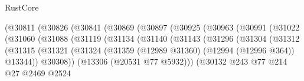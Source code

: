 \begin{lexlean}{RustCore}
\begin{coremodule}
                                      (@30811
                                        (@30826
                                          (@30841
                                            (@30869
                                              (@30897
                                                (@30925
                                                  (@30963
                                                    (@30991
                                                      (@31022
                                                        (@31060
                                                          (@31088
                                                            (@31119
                                                              (@31134
                                                                (@31140
                                                                  (@31143
                                                                    (@31296
                                                                      (@31304
                                                                        (@31312
                                                                          (@31315
                                                                            (@31321
                                                                              (@31324
                                                                                (@31359
                                                                                  (@12989 @31360)
                                                                                  (@12994
                                                                                    (@12996 @364))
                                                                                  @13344))
                                                                              @30308))
                                                                          (@13306
                                                                            (@20531 @77 @5932)))
                                                                        (@30132
                                                                          @243
                                                                          @77
                                                                          @214
                                                                          @27
                                                                          @2469
                                                                          @2524

\end{coremodule}
\end{lexlean}
